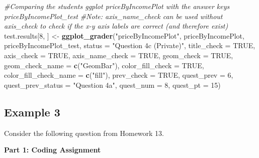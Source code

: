 \documentclass[
  12pt,
]{book}
\newenvironment{Shaded}{\begin{snugshade}}{\end{snugshade}}
\newcommand{\AttributeTok}[1]{\textcolor[rgb]{0.13,0.29,0.53}{#1}}
\newcommand{\CommentTok}[1]{\textcolor[rgb]{0.56,0.35,0.01}{\textit{#1}}}
\newcommand{\ConstantTok}[1]{\textcolor[rgb]{0.56,0.35,0.01}{#1}}
\newcommand{\DecValTok}[1]{\textcolor[rgb]{0.00,0.00,0.81}{#1}}
\newcommand{\FunctionTok}[1]{\textcolor[rgb]{0.13,0.29,0.53}{\textbf{#1}}}
\newcommand{\NormalTok}[1]{#1}
\newcommand{\OtherTok}[1]{\textcolor[rgb]{0.56,0.35,0.01}{#1}}
\newcommand{\StringTok}[1]{\textcolor[rgb]{0.31,0.60,0.02}{#1}}
\begin{document}
\begin{Shaded}
\begin{Highlighting}[]
\CommentTok{\#Comparing the student\textquotesingle{}s ggplot \textasciigrave{}priceByIncomePlot\textasciigrave{} with the answer key\textquotesingle{}s \textasciigrave{}priceByIncomePlot\_test\textasciigrave{} }
\CommentTok{\#Note: \textasciigrave{}axis\_name\_check\textasciigrave{} can be used without \textasciigrave{}axis\_check\textasciigrave{} to check if the x{-}y axis labels are correct (and therefore exist)}
\NormalTok{test.results[}\DecValTok{8}\NormalTok{, ] }\OtherTok{\textless{}{-}} \FunctionTok{ggplot\_grader}\NormalTok{(}\StringTok{"priceByIncomePlot"}\NormalTok{, priceByIncomePlot, priceByIncomePlot\_test, }
                                   \AttributeTok{status =} \StringTok{"Question 4c (Private)"}\NormalTok{, }\AttributeTok{title\_check =} \ConstantTok{TRUE}\NormalTok{, }
                                   \AttributeTok{axis\_check =} \ConstantTok{TRUE}\NormalTok{, }\AttributeTok{axis\_name\_check =} \ConstantTok{TRUE}\NormalTok{, }
                                   \AttributeTok{geom\_check =} \ConstantTok{TRUE}\NormalTok{, }\AttributeTok{geom\_check\_name =} \FunctionTok{c}\NormalTok{(}\StringTok{"GeomBar"}\NormalTok{), }
                                   \AttributeTok{color\_fill\_check =} \ConstantTok{TRUE}\NormalTok{, }\AttributeTok{color\_fill\_check\_name =} \FunctionTok{c}\NormalTok{(}\StringTok{"fill"}\NormalTok{), }
                                   \AttributeTok{prev\_check =} \ConstantTok{TRUE}\NormalTok{, }\AttributeTok{quest\_prev =} \DecValTok{6}\NormalTok{, }\AttributeTok{quest\_prev\_status =} \StringTok{"Question 4a"}\NormalTok{,}
                                   \AttributeTok{quest\_num =} \DecValTok{8}\NormalTok{, }\AttributeTok{quest\_pt =} \DecValTok{15}\NormalTok{) }
\end{Highlighting}
\end{Shaded}

\subsection*{Example 3}\label{example-3}

Consider the following question from Homework 13.

\textbf{Part 1: Coding Assignment}
\end{document}
